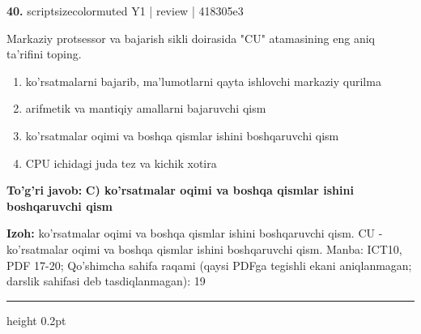 \documentclass[10pt,a4paper]{article}
\begin{document}
{\bfseries\sffamily\color{ink} 40.} {scriptsizecolor{muted} Y1 | review | 418305e3}
\par
Markaziy protsessor va bajarish sikli doirasida "CU" atamasining eng aniq ta'rifini toping.
\begin{enumerate}[label=\Alph*),leftmargin=9mm]
\item ko'rsatmalarni bajarib, ma'lumotlarni qayta ishlovchi markaziy qurilma
\item arifmetik va mantiqiy amallarni bajaruvchi qism
\item ko'rsatmalar oqimi va boshqa qismlar ishini boshqaruvchi qism
\item CPU ichidagi juda tez va kichik xotira
\end{enumerate}
\begin{tcolorbox}[enhanced,breakable,colback=teal!4,colframe=teal!60!black,boxrule=0.45pt,arc=1.2mm,left=2.7mm,right=2.7mm,top=1.8mm,bottom=1.8mm,before skip=2mm,after skip=2mm]
{\bfseries\sffamily\color{teal}To'g'ri javob:} \textbf{C) ko'rsatmalar oqimi va boshqa qismlar ishini boshqaruvchi qism}
\par\smallskip
{\bfseries Izoh:} ko'rsatmalar oqimi va boshqa qismlar ishini boshqaruvchi qism. CU - ko'rsatmalar oqimi va boshqa qismlar ishini boshqaruvchi qism. Manba: ICT10, PDF 17-20; Qo'shimcha sahifa raqami (qaysi PDFga tegishli ekani aniqlanmagan; darslik sahifasi deb tasdiqlanmagan): 19
\end{tcolorbox}
\vspace{2mm}\hrule height 0.2pt\vspace{3mm}
\end{document}
